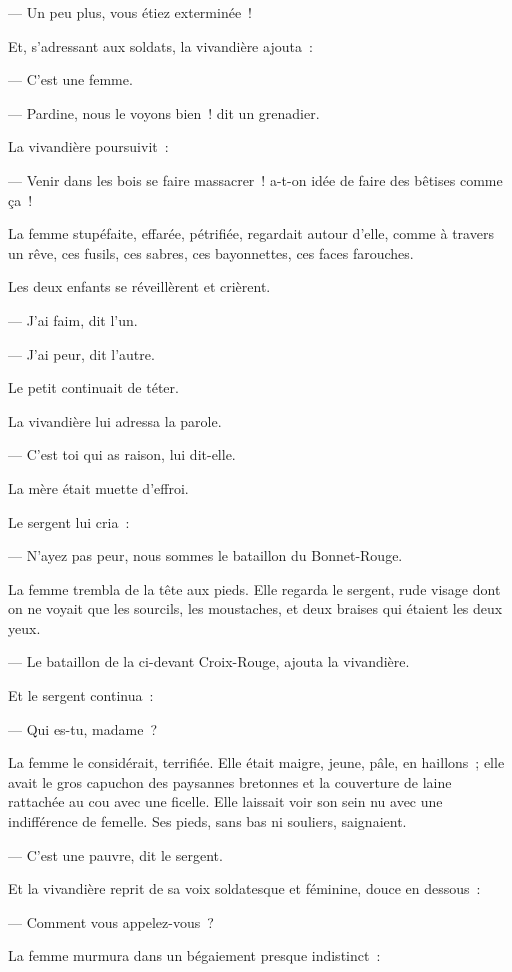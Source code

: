 \documentclass[french,twoside]{book} %
\begin{document}
— Un peu plus, vous étiez exterminée !\par
Et, s’adressant aux soldats, la vivandière ajouta :\par
— C’est une femme.\par
— Pardine, nous le voyons bien ! dit un grenadier.\par
 La vivandière poursuivit :\par
— Venir dans les bois se faire massacrer ! a-t-on idée de faire des bêtises comme ça !\par
La femme stupéfaite, effarée, pétrifiée, regardait autour d’elle, comme à travers un rêve, ces fusils, ces sabres, ces bayonnettes, ces faces farouches.\par
Les deux enfants se réveillèrent et crièrent.\par
— J’ai faim, dit l’un.\par
— J’ai peur, dit l’autre.\par
Le petit continuait de téter.\par
La vivandière lui adressa la parole.\par
— C’est toi qui as raison, lui dit-elle.\par
La mère était muette d’effroi.\par
Le sergent lui cria :\par
— N’ayez pas peur, nous sommes le bataillon du Bonnet-Rouge.\par
La femme trembla de la tête aux pieds. Elle regarda le sergent, rude visage dont on ne voyait que les sourcils, les moustaches, et deux braises qui étaient les deux yeux.\par
— Le bataillon de la ci-devant Croix-Rouge, ajouta la vivandière.\par
Et le sergent continua :\par
— Qui es-tu, madame ?\par
La femme le considérait, terrifiée. Elle était maigre, jeune, pâle, en haillons ; elle avait le gros capuchon des paysannes bretonnes et la couverture de laine rattachée au cou avec une ficelle. Elle laissait voir son sein nu avec une indifférence de femelle. Ses pieds, sans bas ni souliers, saignaient.\par
 — C’est une pauvre, dit le sergent.\par
Et la vivandière reprit de sa voix soldatesque et féminine, douce en dessous :\par
— Comment vous appelez-vous ?\par
La femme murmura dans un bégaiement presque indistinct :\par
\end{document}
